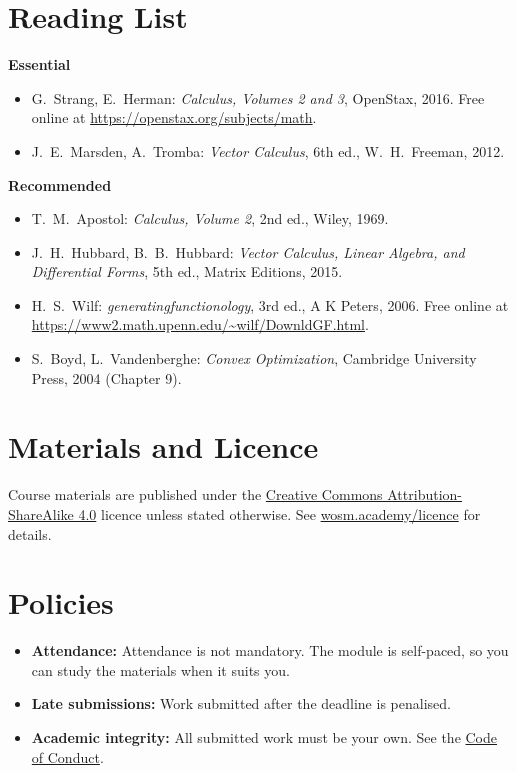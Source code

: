 \documentclass[11pt,a4paper]{article}
\begin{document}
\section{Reading List}
\textbf{Essential}
\begin{itemize}
  \item G.\ Strang, E.\ Herman: \textit{Calculus, Volumes 2 and 3}, OpenStax, 2016. Free online at \url{https://openstax.org/subjects/math}.
  \item J.\ E.\ Marsden, A.\ Tromba: \textit{Vector Calculus}, 6th ed., W.\ H.\ Freeman, 2012.
\end{itemize}
\textbf{Recommended}
\begin{itemize}
  \item T.\ M.\ Apostol: \textit{Calculus, Volume 2}, 2nd ed., Wiley, 1969.
  \item J.\ H.\ Hubbard, B.\ B.\ Hubbard: \textit{Vector Calculus, Linear Algebra, and Differential Forms}, 5th ed., Matrix Editions, 2015.
  \item H.\ S.\ Wilf: \textit{generatingfunctionology}, 3rd ed., A K Peters, 2006. Free online at \url{https://www2.math.upenn.edu/~wilf/DownldGF.html}.
  \item S.\ Boyd, L.\ Vandenberghe: \textit{Convex Optimization}, Cambridge University Press, 2004 (Chapter 9).
\end{itemize}

\section{Materials and Licence}
Course materials are published under the
\href{https://creativecommons.org/licenses/by-sa/4.0/}{Creative Commons Attribution-ShareAlike 4.0}
licence unless stated otherwise. See \href{https://wosm.academy/licence/}{wosm.academy/licence} for details.

\section{Policies}
\begin{itemize}
  \item \textbf{Attendance:} Attendance is not mandatory. The module is self-paced, so you can study the materials when it suits you.
  \item \textbf{Late submissions:} Work submitted after the deadline is penalised.
  \item \textbf{Academic integrity:} All submitted work must be your own.
        See the \href{https://wosm.academy/code-of-conduct/}{Code of Conduct}.
\end{itemize}
\end{document}
